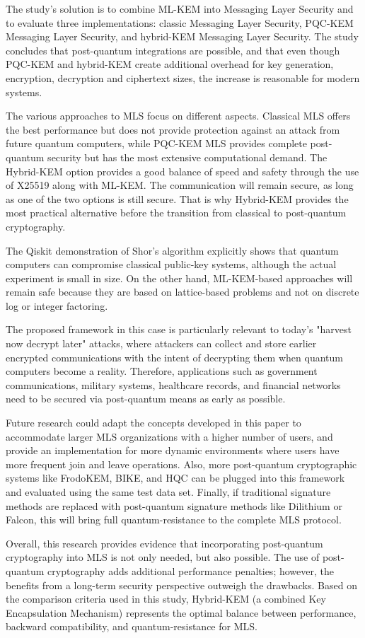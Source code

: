\documentclass{ieeeaccess}
\begin{document}
The study's solution is to combine ML-KEM into Messaging Layer Security and to evaluate three implementations: classic Messaging Layer Security, PQC-KEM Messaging Layer Security, and hybrid-KEM Messaging Layer Security. The study concludes that post-quantum integrations are possible, and that even though PQC-KEM and hybrid-KEM create additional overhead for key generation, encryption, decryption and ciphertext sizes, the increase is reasonable for modern systems.

The various approaches to MLS focus on different aspects. Classical MLS offers the best performance but does not provide protection against an attack from future quantum computers, while PQC-KEM MLS provides complete post-quantum security but has the most extensive computational demand. The Hybrid-KEM option provides a good balance of speed and safety through the use of X25519 along with ML-KEM. The communication will remain secure, as long as one of the two options is still secure. That is why Hybrid-KEM provides the most practical alternative before the transition from classical to post-quantum cryptography.

The Qiskit demonstration of Shor's algorithm explicitly shows that quantum computers can compromise classical public-key systems, although the actual experiment is small in size. On the other hand, ML-KEM-based approaches will remain safe because they are based on lattice-based problems and not on discrete log or integer factoring.

The proposed framework in this case is particularly relevant to today's "harvest now decrypt later" attacks, where attackers can collect and store earlier encrypted communications with the intent of decrypting them when quantum computers become a reality. Therefore, applications such as government communications, military systems, healthcare records, and financial networks need to be secured via post-quantum means as early as possible.

Future research could adapt the concepts developed in this paper to accommodate larger MLS organizations with a higher number of users, and provide an implementation for more dynamic environments where users have more frequent join and leave operations. Also, more post-quantum cryptographic systems like FrodoKEM, BIKE, and HQC can be plugged into this framework and evaluated using the same test data set. Finally, if traditional signature methods are replaced with post-quantum signature methods like Dilithium or Falcon, this will bring full quantum-resistance to the complete MLS protocol.

Overall, this research provides evidence that incorporating post-quantum cryptography into MLS is not only needed, but also possible. The use of post-quantum cryptography adds additional performance penalties; however, the benefits from a long-term security perspective outweigh the drawbacks. Based on the comparison criteria used in this study, Hybrid-KEM (a combined Key Encapsulation Mechanism) represents the optimal balance between performance, backward compatibility, and quantum-resistance for MLS.




\EOD
\end{document}
